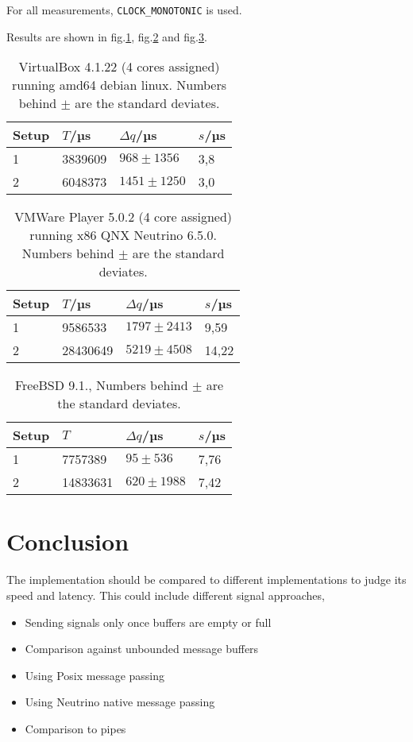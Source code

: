 \documentclass[12pt]{article}
\begin{document}
For all measurements, \texttt{CLOCK\_MONOTONIC} is used.
\FloatBarrier

Results are shown in fig.\ref{tab:resdebian}, fig.\ref{tab:resneutrino} and fig.\ref{tab:resbsd}.

\begin{table}
\label{tab:resdebian}
\centering
\begin{tabular}{l l l l}
 Setup & $T$/µs & $\Delta q$/µs & $s$/µs \\
 \hline
 1 & 3839609 & $968\pm 1356$ & 3,8 \\
 2 & 6048373 & $1451\pm 1250$ & 3,0 \\
\end{tabular}
\caption{VirtualBox 4.1.22 (4 cores assigned) running amd64 debian linux.
         Numbers behind $\pm$ are the standard deviates.}
\end{table}

\begin{table}
\label{tab:resneutrino}
\centering
\begin{tabular}{l l l l}
 Setup & $T$/µs & $\Delta q$/µs & $s$/µs \\
 \hline
 1 & 9586533 & $1797\pm 2413$ & 9,59 \\
 2 & 28430649 & $5219\pm 4508$ & 14,22 \\
\end{tabular}
\caption{VMWare Player 5.0.2 (4 core assigned) running x86 QNX Neutrino 6.5.0.
         Numbers behind $\pm$ are the standard deviates.}
\end{table}

\begin{table}
\label{tab:resbsd}
\centering
\begin{tabular}{l l l l}
 Setup & $T$ & $\Delta q$/µs & $s$/µs \\
 \hline
 1 & 7757389 & $ 95\pm 536$ & 7,76 \\
 2 & 14833631 & $ 620\pm 1988$ & 7,42 \\
\end{tabular}
\caption{FreeBSD 9.1.,
         Numbers behind $\pm$ are the standard deviates.}
\end{table}
\FloatBarrier
\newpage
\mbox{}
\pagebreak
\section{Conclusion}
The implementation should be compared to different implementations to judge its speed and latency.
This could include different signal approaches,
\begin{itemize}
 \item Sending signals only once buffers are empty or full
 \item Comparison against unbounded message buffers
 \item Using Posix message passing
 \item Using Neutrino native message passing
 \item Comparison to pipes
\end{itemize}
\end{document}
